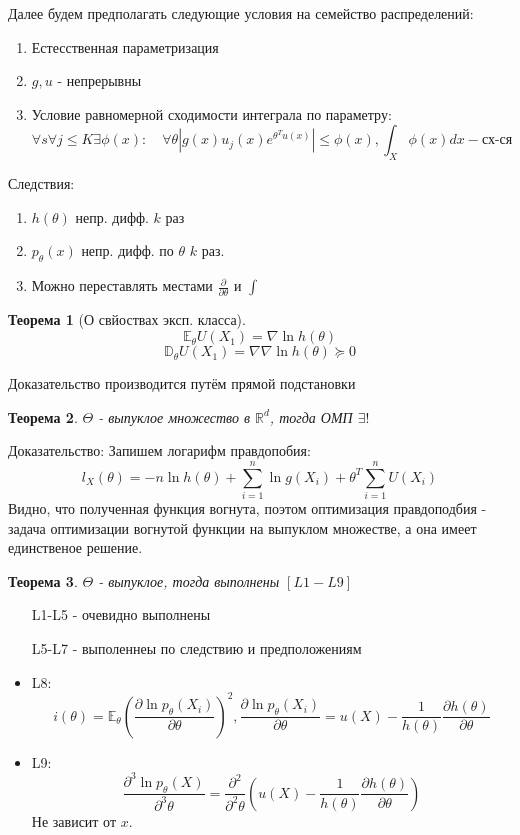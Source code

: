 \documentclass[a4paper,12pt]{article}
\newcommand{\expec}{\mathbb{E}}
\newcommand{\disp}{\mathbb{D}}
\newcommand{\sumin}{\sum\limits_{i=1}^n}
\newcommand{\R}{\mathbb{R}}
\theoremstyle{named}
\newtheorem*{namedtheorem}{Теорема}
\begin{document}
Далее будем предполагать следующие условия на семейство распределений:
\begin{enumerate}
    \item Естесственная параметризация 
    \item $g, u$ - непрерывны
    \item Условие равномерной сходимости интеграла по параметру:
    $$
        \forall s \forall j \leq K \exists \phi(x): \quad \forall\theta |g(x)u_j(x)e^{\theta^Tu(x)}| \leq \phi(x), \int_X \phi(x) dx - \text{сх-ся} 
    $$
\end{enumerate}
Следствия:
\begin{enumerate}
    \item $h(\theta)$ непр. дифф. $k$ раз 
    \item $p_\theta(x)$ непр. дифф. по $\theta \,\, k$ раз. 
    \item Можно переставлять местами $\frac{\partial}{\partial\theta}$ и $\int$ 
\end{enumerate}
\begin{namedtheorem}[О свйоствах эксп. класса]
    $$
        \expec_\theta U(X_1) = \nabla \ln h(\theta)
    $$
    $$
        \disp_\theta U(X_1) = \nabla \nabla \ln h(\theta) \succeq 0
    $$
\end{namedtheorem}
Доказательство производится путём прямой подстановки
\begin{namedtheorem}
    $\Theta$  - выпуклое множество в $\R^d$, тогда ОМП $\exists!$
\end{namedtheorem}
Доказательство: Запишем логарифм правдопобия:
$$
    l_X(\theta)  = -n\ln h(\theta) + \sumin \ln g(X_i) + \theta^T \sumin U(X_i) 
$$
Видно, что полученная функция вогнута, поэтом оптимизация правдоподбия - задача оптимизации вогнутой функции на выпуклом 
множестве, а она имеет единственое решение. 
\begin{namedtheorem}
    $\Theta$ - выпуклое, тогда выполнены $[L1-L9]$
\end{namedtheorem}
\begin{itemize}
    \item [L1-L5] - очевидно выполнены 
    \item [L5-L7] - выполеннеы по следствию и предположениям
    \item L8: 
    $$
        i(\theta) = \expec_\theta\left(\frac{\partial\ln p_\theta(X_i)}{\partial\theta}\right)^2, \frac{\partial\ln p_\theta(X_i)}{\partial\theta} 
        = u(X) - \frac{1}{h(\theta)}\frac{\partial h(\theta)}{\partial \theta}
    $$
    \item L9:
    $$
        \frac{\partial^3 \ln p_\theta(X)}{\partial^3 \theta} = \frac{\partial^2}{\partial^2\theta}\left(u(X) - \frac{1}{h(\theta)}\frac{\partial h(\theta)}{\partial \theta}\right)
    $$
    Не зависит от $x$.
\end{itemize}
\end{document}
